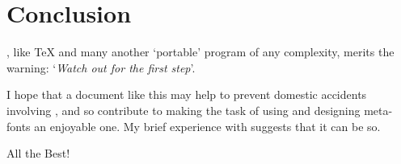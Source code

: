 \section{Conclusion}

\MF{}, like \TeX{} and many another `portable' program of any
complexity, merits the warning: `{\em Watch out for the first step\/}'.

I hope that a document like this may help to prevent domestic
accidents involving \MF{}, and so contribute to making the task
of using and designing meta-fonts an enjoyable one.  My brief
experience with \MF{} suggests that it can be so.


All the Best!




